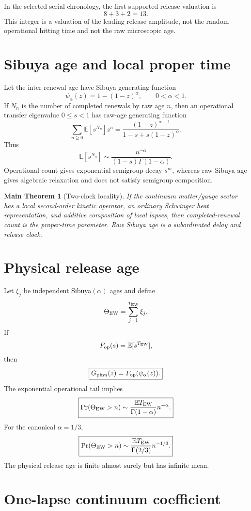 \documentclass[11pt,oneside,openany]{book}
\numberwithin{equation}{chapter}
\newtheorem{maintheorem}[theorem]{Main Theorem}
\theoremstyle{definition}
\theoremstyle{remark}
\begin{document}
In the selected serial chronology, the first supported release valuation is
\[
 \boxed{
 8+3+2=13.}
\]
This integer is a valuation of the leading release amplitude, not the random
operational hitting time and not the raw microscopic age.

\section{Sibuya age and local proper time}

Let the inter-renewal age have Sibuya generating function
\[
 \psi_\alpha(z)=1-(1-z)^\alpha,
 \qquad
 0<\alpha<1.
\]
If \(N_n\) is the number of completed renewals by raw age \(n\), then an
operational transfer eigenvalue \(0\le s<1\) has raw-age generating function
\[
 \boxed{
 \sum_{n\ge0}\mathbb E[s^{N_n}]z^n
 =
 \frac{(1-z)^{\alpha-1}}
 {1-s+s(1-z)^\alpha}.}
\]
Thus
\[
 \boxed{
 \mathbb E[s^{N_n}]
 \sim
 \frac{n^{-\alpha}}
 {(1-s)\Gamma(1-\alpha)}.}
\]
Operational count gives exponential semigroup decay \(s^m\), whereas raw
Sibuya age gives algebraic relaxation and does not satisfy semigroup
composition.

\begin{maintheorem}[Two-clock locality]
\label{thm:two-clock-locality}
If the continuum matter/gauge sector has a local second-order kinetic
operator, an ordinary Schwinger heat representation, and additive
composition of local lapses, then completed-renewal count is the proper-time
parameter.  Raw Sibuya age is a subordinated delay and release clock.
\end{maintheorem}

\section{Physical release age}

Let \(\xi_j\) be independent Sibuya\((\alpha)\) ages and define
\[
 \Theta_{\rm EW}
 =
 \sum_{j=1}^{T_{\rm EW}}\xi_j.
\]
If
\[
 F_{\rm op}(s)=\mathbb E[s^{T_{\rm EW}}],
\]
then
\[
 \boxed{
 G_{\rm phys}(z)
 =
 F_{\rm op}(\psi_\alpha(z)).}
\]
The exponential operational tail implies
\[
 \boxed{
 \Pr(\Theta_{\rm EW}>n)
 \sim
 \frac{\mathbb ET_{\rm EW}}
 {\Gamma(1-\alpha)}
 n^{-\alpha}.}
\]
For the canonical \(\alpha=1/3\),
\[
 \boxed{
 \Pr(\Theta_{\rm EW}>n)
 \sim
 \frac{\mathbb ET_{\rm EW}}
 {\Gamma(2/3)}
 n^{-1/3}.}
\]
The physical release age is finite almost surely but has infinite mean.

\section{One-lapse continuum coefficient}
\end{document}
